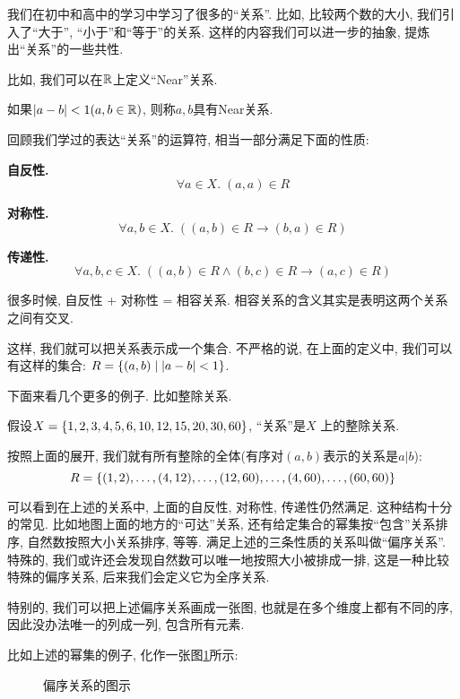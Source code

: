 我们在初中和高中的学习中学习了很多的``关系''. 比如, 比较两个数的大小, 我们引入了``大于'', ``小于''和``等于''的关系. 这样的内容我们可以进一步的抽象, 提炼出``关系''的一些共性. 

比如, 我们可以在$\mathbb{R}$上定义``Near''关系.

\begin{eg}
    如果$|a - b| < 1(a, b \in \mathbb{R})$, 则称$a, b$具有Near关系. 
\end{eg}

回顾我们学过的表达``关系''的运算符, 相当一部分满足下面的性质: 

\textbf{自反性. }
$$\forall a \in X.\; (a, a) \in R$$

\textbf{对称性. }
$$\forall a, b \in X.\; ((a, b) \in R \to (b, a) \in R)$$

\textbf{传递性. }
$$\forall a, b, c \in X.\; ((a, b) \in R \land (b, c) \in R \to (a, c) \in R)$$

很多时候, 自反性 + 对称性 = 相容关系. 相容关系的含义其实是表明这两个关系之间有交叉.

这样, 我们就可以把关系表示成一个集合. 不严格的说, 在上面的定义中, 我们可以有这样的集合: $R = \{(a, b) \mid |a - b| < 1\}$. 

下面来看几个更多的例子. 比如整除关系. 

\begin{eg}
    假设$X = \{1, 2, 3, 4, 5, 6, 10, 12, 15, 20, 30, 60\}$, ``关系''是$X$ 上的整除关系. 
\end{eg}

按照上面的展开, 我们就有所有整除的全体(有序对$(a,b)$表示的关系是$a|b$):
$$R = \{(1, 2), \dots, (4, 12), \dots, (12, 60), \dots, (4, 60), \dots, (60, 60)\}$$

可以看到在上述的关系中, 上面的自反性, 对称性, 传递性仍然满足. 这种结构十分的常见. 比如地图上面的地方的``可达''关系, 还有给定集合的幂集按``包含''关系排序, 自然数按照大小关系排序, 等等. 满足上述的三条性质的关系叫做``偏序关系''. 特殊的, 我们或许还会发现自然数可以唯一地按照大小被排成一排, 这是一种比较特殊的偏序关系, 后来我们会定义它为全序关系. 

特别的, 我们可以把上述偏序关系画成一张图, 也就是在多个维度上都有不同的序, 因此没办法唯一的列成一列, 包含所有元素. 

比如上述的幂集的例子, 化作一张图\ref{fig:part-order-fig}所示: 
\begin{figure}[!htbp]
	\begin{center}
	\end{center}
	\caption{偏序关系的图示}
	\label{fig:part-order-fig}
\end{figure}

